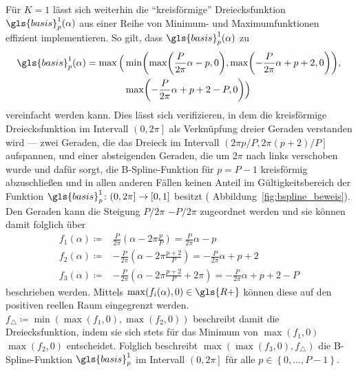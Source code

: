 

Für $K=1$ lässt sich weiterhin die \enquote{kreisförmige} Dreiecksfunktion $\gls{basis}_p^1\left(\alpha\right)$ aus einer Reihe von Minimum- und Maximumfunktionen effizient implementieren.
So gilt, dass $\gls{basis}_p^1\left(\alpha\right)$ zu
\begin{equation*}
  \begin{split}
    \gls{basis}_p^1\left(\alpha\right) = \max \Big( & \min \left( \max\left(\frac{P}{2\pi}\alpha - p, 0\right), \max\left(-\frac{P}{2\pi}\alpha + p + 2, 0\right)\right),\\
    & \max\left(-\frac{P}{2\pi}\alpha + p + 2 - P, 0\right) \Big)
  \end{split}
\end{equation*}
vereinfacht werden kann.
Dies lässt sich verifizieren, in dem die kreisförmige Dreiecksfunktion im Intervall $\left(0, 2\pi\right]$ als Verknüpfung dreier Geraden verstanden wird — zwei Geraden, die das Dreieck im Intervall $\left(2\pi p/P, 2\pi \left(p+2\right)/P\right]$ aufspannen, und einer absteigenden Geraden, die um $2\pi$ nach links verschoben wurde und dafür sorgt, die B-Spline-Funktion für $p=P-1$ kreisförmig abzuschließen und in allen anderen Fällen keinen Anteil im Gültigkeitsbereich der Funktion $\gls{basis}_p^1 \colon \left(0,2\pi\right] \to \left[0,1\right]$ besitzt (\vgl{} Abbildung~\ref{fig:bspline_beweis}).
Den Geraden kann die Steigung $P/2\pi$ \bzw{} $-P/2\pi$ zugeordnet werden und sie können damit folglich über
\begin{equation*}
\begin{split}
  f_1\left(\alpha\right) \coloneqq & \frac{P}{2\pi}\left(\alpha - 2\pi\frac{p}{P}\right) = \frac{P}{2\pi}\alpha - p\\
  f_2\left(\alpha\right) \coloneqq & - \frac{P}{2\pi}\left(\alpha - 2\pi\frac{p+2}{P}\right) = - \frac{P}{2\pi}\alpha + p + 2\\
  f_3\left(\alpha\right) \coloneqq & - \frac{P}{2\pi}\left(\alpha - 2\pi\frac{p+2}{P} + 2\pi\right) = - \frac{P}{2\pi}\alpha + p + 2 - P
\end{split}
\end{equation*}
beschrieben werden.
Mittels $\max\left(f_i\left(\alpha\right), 0\right) \in \gls{R+}$ können diese auf den positiven reellen Raum eingegrenzt werden.
$f_{\triangle} \coloneqq \min\left(\max\left(f_1, 0\right), \max\left(f_2, 0\right)\right)$ beschreibt damit die Dreiecksfunktion, indem sie sich stets für das Minimum von $\max\left(f_1, 0\right)$ \bzw{} $\max\left(f_2,0\right)$ entscheidet.
Folglich beschreibt $\max\left(\max\left(f_3,0\right), f_{\triangle}\right)$ die B-Spline-Funktion $\gls{basis}_p^1$ im Intervall $\left(0, 2\pi\right]$ für alle $p \in \left\{0, \ldots, P-1\right\}$.
